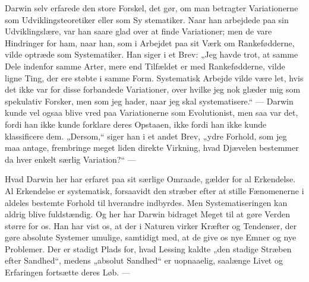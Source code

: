 \documentclass[12pt,a4paper,openany]{book}
\newcommand{\opage}[1]{\marginnote{\footnotesize\textit{[#1]}}}
\begin{document}
Darwin selv erfarede den store Forskel, det gør, om man
betragter Variationerne som Udviklingsteoretiker eller som Sy%
\setcounter{footnote}{0}%
\opage{218}stematiker. Naar han arbejdede paa sin Udviklingslære, var
han saare glad over at finde Variationer; men de vare Hindringer
for ham, naar han, som i Arbejdet paa sit Værk om
Rankefødderne, vilde optræde som Systematiker. Han siger i
et Brev: „Jeg havde trot, at samme Dele indenfor samme Arter,
mere end Tilfældet er med Rankefødderne, vilde ligne Ting,
der ere støbte i samme Form. Systematisk Arbejde vilde være
let, hvis det ikke var for disse forbandede Variationer, over
hvilke jeg nok glæder mig som spekulativ Forsker, men som
jeg hader, naar jeg skal systematisere.“ --- Darwin kunde vel
ogsaa blive vred paa Variationerne som Evolutionist, men saa
var det, fordi han ikke kunde forklare deres Opstaaen, ikke
fordi han ikke kunde klassificere dem. „Dersom,“ siger han i
et andet Brev, „ydre Forhold, som jeg maa antage, frembringe
meget liden direkte Virkning, hvad Djævelen bestemmer da
hver enkelt særlig Variation?“ ---

Hvad Darwin her har erfaret paa sit særlige Omraade,
gælder for al Erkendelse. Al Erkendelse er systematisk, forsaavidt
den stræber efter at stille Fænomenerne i aldeles bestemte
Forhold til hverandre indbyrdes. Men Systematiseringen
kan aldrig blive fuldstændig. Og her har Darwin bidraget
Meget til at gøre Verden større for os. Han har vist os, at
der i Naturen virker Kræfter og Tendenser, der gøre absolute
Systemer umulige, samtidigt med, at de give os nye Emner og
nye Problemer. Der er stadigt Plads for, hvad Lessing kaldte
„den stadige Stræben efter Sandhed“, medens „absolut Sandhed“
er uopnaaelig, saalænge Livet og Erfaringen fortsætte
deres Løb. ---
\end{document}
